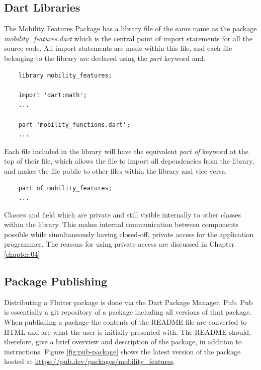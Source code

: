 \subsection{Dart Libraries}
The Mobility Features Package has a library file of the same name as the package \textit{mobility\_features.dart} which is the central point of import statements for all the source code. All import statements are made within this file, and each file belonging to the library are declared using the \textit{part} keyword and. 

\begin{verbatim}
    library mobility_features;
    
    import 'dart:math';
    ...
    
    part 'mobility_functions.dart';
    ...
\end{verbatim}

Each file included in the library will have the equivalent \textit{part of} keyword at the top of their file, which allows the file to import all dependencies from the library, and makes the file public to other files within the library and vice versa.

\begin{verbatim}
    part of mobility_features;
    ...
\end{verbatim}

Classes and field which are private and still visible internally to other classes within the library. This makes internal communication between components possible while simultaneously having closed-off, private access for the application programmer. The reasons for using private access are discussed in Chapter \ref{chapter:04}

\subsection{Package Publishing}
Distributing a Flutter package is done via the Dart Package Manager, Pub. Pub is essentially a git repository of a package including all versions of that package. When publishing a package the contents of the README file are converted to HTML and are what the user is initially presented with. The README should, therefore, give a brief overview and description of the package, in addition to instructions. Figure \ref{fig:pub-package} shows the latest version of the package hosted at \url{https://pub.dev/packages/mobility_features}.


